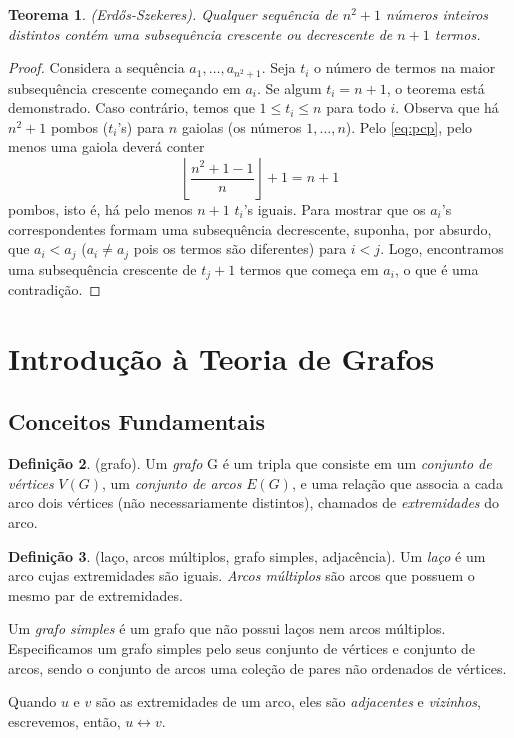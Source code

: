 \documentclass{article}
\theoremstyle{plain}
\newtheorem{thm}{Teorema}[section]
\theoremstyle{definition}
\newtheorem{defn}[thm]{Definição}
\theoremstyle{remark}
\begin{document}
\begin{thm} (Erdős-Szekeres).
    Qualquer sequência de \(n^2+1\) números inteiros distintos contém uma subsequência crescente ou decrescente de \(n+1\) termos.
\end{thm}

\begin{proof}
    Considera a sequência \(a_1, \ldots, a_{n^2+1}\). Seja \(t_i\) o número de termos na maior subsequência crescente começando em \(a_i\). Se algum \(t_i=n+1\), o teorema está demonstrado. 
    Caso contrário, temos que \(1\leq t_i \leq n\) para todo \(i\). Observa que há \(n^2+1\) pombos (\(t_i\)'s) para \(n\) gaiolas (os números \(1, \ldots, n\)). Pelo \eqref{eq:pcp}, pelo menos uma gaiola deverá conter
    \begin{equation*}
        \left \lfloor \frac{n^2+1-1}{n} \right \rfloor + 1 = n+1
    \end{equation*}
    \noindent pombos, isto é, há pelo menos \(n+1\) \(t_i\)'s iguais. Para mostrar que os \(a_i\)'s correspondentes formam uma subsequência decrescente, suponha, por absurdo, que \(a_i < a_j\) (\(a_i \neq a_j\) pois os termos são diferentes) para \(i < j\).
    Logo, encontramos uma subsequência crescente de \(t_{j}+1\) termos que começa em \(a_i\), o que é uma contradição.
\end{proof}

\section{Introdução à Teoria de Grafos}

\subsection{Conceitos Fundamentais}

\begin{defn} (grafo).
    Um \emph{grafo} G é um tripla que consiste em um \emph{conjunto de vértices} \(V(G)\), um \emph{conjunto de arcos} \(E(G)\), e uma relação que associa a cada arco dois vértices (não necessariamente distintos), chamados de \emph{extremidades} do arco.
\end{defn}

\begin{defn} (laço, arcos múltiplos, grafo simples, adjacência).
    Um \emph{laço} é um arco cujas extremidades são iguais. \emph{Arcos múltiplos} são arcos que possuem o mesmo par de extremidades. 
    
    Um \emph{grafo simples} é um grafo que não possui laços nem arcos múltiplos. Especificamos um grafo simples pelo seus conjunto de vértices e conjunto de arcos, sendo o conjunto de arcos uma coleção de pares não ordenados de vértices. 
    
    Quando \(u\) e \(v\) são as extremidades de um arco, eles são \emph{adjacentes} e \emph{vizinhos}, escrevemos, então, \(u \leftrightarrow v\).
\end{defn}
\end{document}
